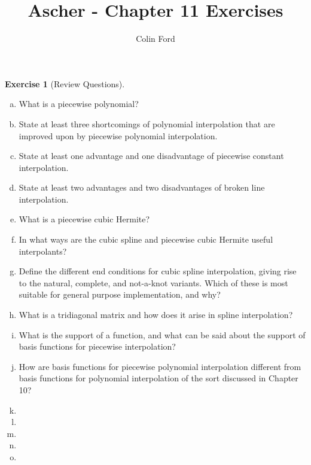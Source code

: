 \documentclass[12pt,a4]{article}
\author{Colin Ford}
\title{Ascher - Chapter 11 Exercises}
\date{}
\theoremstyle{definition}
\newtheorem{exercise}{Exercise}
\begin{document}
\maketitle

\begin{exercise}[Review Questions]
	\begin{enumerate}[(a)]
		\item What is a piecewise polynomial?
		
		\item State at least three shortcomings of polynomial interpolation that are improved upon by piecewise polynomial interpolation.
		
		\item State at least one advantage and one disadvantage of piecewise constant interpolation.
	
		\item State at least two advantages and two disadvantages of broken line interpolation.
		
		\item What is a piecewise cubic Hermite?
		
		\item In what ways are the cubic spline and piecewise cubic Hermite useful interpolants?
		
		\item Define the different end conditions for cubic spline interpolation, giving rise to the natural, complete, and not-a-knot variants. Which of these is most suitable for general purpose implementation, and why?
		
		\item What is a tridiagonal matrix and how does it arise in spline interpolation?
		
		\item What is the support of a function, and what can be said about the support of basis functions for piecewise interpolation?
		
		\item How are basis functions for piecewise polynomial interpolation different from basis functions for polynomial interpolation of the sort discussed in Chapter 10?
		
		\item 
		
		\item 
		
		\item 
		
		\item 
		
		\item 
		
	\end{enumerate}
\end{exercise}
\end{document}
